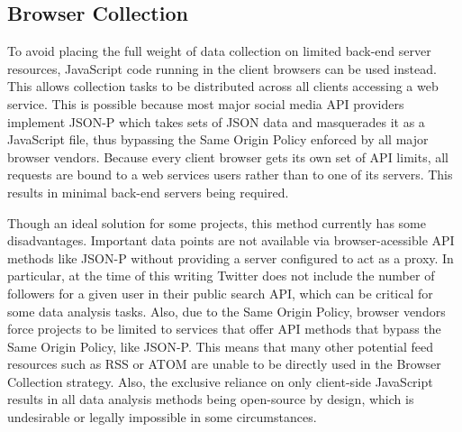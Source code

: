 \documentclass[letterpaper]{article}
\begin{document}

\subsection{Browser Collection}

To avoid placing the full weight of data collection on limited back-end server resources, JavaScript code running in the client browsers can be used instead. This allows collection tasks to be distributed across all clients accessing a web service. This is possible because most major social media API providers implement JSON-P which takes sets of JSON data and masquerades it as a JavaScript file, thus bypassing the Same Origin Policy enforced by all major browser vendors. Because every client browser gets its own set of API limits, all requests are bound to a web services users rather than to one of its servers. This results in minimal back-end servers being required.

Though an ideal solution for some projects, this method currently has some disadvantages. Important data points are not available via browser-acessible API methods like JSON-P without providing a server configured to act as a proxy. In particular, at the time of this writing Twitter does not include the number of followers for a given user in their public search API, which can be critical for some data analysis tasks. Also, due to the Same Origin Policy, browser vendors force projects to be limited to services that offer API methods that bypass the Same Origin Policy, like JSON-P. This means that many other potential feed resources such as RSS or ATOM are unable to be directly used in the Browser Collection strategy. Also, the exclusive reliance on only client-side JavaScript results in all data analysis methods being open-source by design, which is undesirable or legally impossible in some circumstances.
\end{document}
